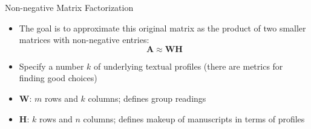 \documentclass[10pt]{beamer}
\begin{document}
	\begin{frame}{Non-negative Matrix Factorization}
		\begin{itemize}
			\item The goal is to approximate this original matrix as the product of two smaller matrices with non-negative entries:
			\begin{equation*}
				\mathbf{A} \approx \mathbf{W}\mathbf{H}
			\end{equation*}
			\item Specify a number $k$ of underlying textual profiles (there are metrics for finding good choices)
			\item $\mathbf{W}$: $m$ rows and $k$ columns; defines group readings
			\item $\mathbf{H}$: $k$ rows and $n$ columns; defines makeup of manuscripts in terms of profiles
		\end{itemize}
	\end{frame}
\end{document}
